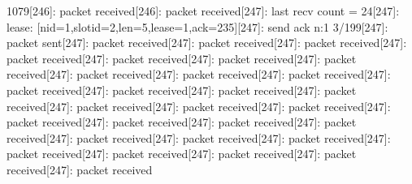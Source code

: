 \documentclass[parskip]{cs4rep}
\begin{document}
1079[246]: packet received[246]: packet received[247]: last recv count = 24[247]: lease: [nid=1,slotid=2,len=5,lease=1,ack=235][247]: send ack n:1 3/199[247]: packet sent[247]: packet received[247]: packet received[247]: packet received[247]: packet received[247]: packet received[247]: packet received[247]: packet received[247]: packet received[247]: packet received[247]: packet received[247]: packet received[247]: packet received[247]: packet received[247]: packet received[247]: packet received[247]: packet received[247]: packet received[247]: packet received[247]: packet received[247]: packet received[247]: packet received[247]: packet received[247]: packet received[247]: packet received[247]: packet received[247]: packet received[247]: packet received[247]: packet received[247]: packet received\newline
\end{document}
